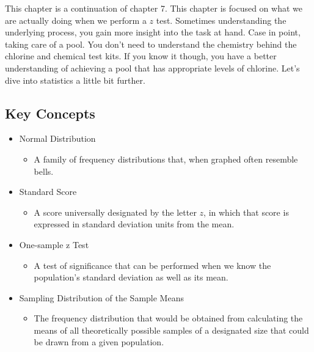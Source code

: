 \documentclass[]{article}
\begin{document}
This chapter is a continuation of chapter 7. This chapter is focused on
what we are actually doing when we perform a $z$ test. Sometimes
understanding the underlying process, you gain more insight into the
task at hand. Case in point, taking care of a pool. You don't need to
understand the chemistry behind the chlorine and chemical test kits. If
you know it though, you have a better understanding of achieving a pool
that has appropriate levels of chlorine. Let's dive into statistics a
little bit further.

\subsection{Key Concepts}\label{key-concepts}

\begin{itemize}
\itemsep1pt\parskip0pt
\item
  Normal Distribution

  \begin{itemize}
  \itemsep1pt\parskip0pt
  \item
    A family of frequency distributions that, when graphed often
    resemble bells.
  \end{itemize}
\item
  Standard Score

  \begin{itemize}
  \itemsep1pt\parskip0pt
  \item
    A score universally designated by the letter $z$, in which that
    score is expressed in standard deviation units from the mean.
  \end{itemize}
\item
  One-sample z Test

  \begin{itemize}
  \itemsep1pt\parskip0pt
  \item
    A test of significance that can be performed when we know the
    population's standard deviation as well as its mean.
  \end{itemize}
\item
  Sampling Distribution of the Sample Means

  \begin{itemize}
  \itemsep1pt\parskip0pt
  \item
    The frequency distribution that would be obtained from calculating
    the means of all theoretically possible samples of a designated size
    that could be drawn from a given population.
  \end{itemize}
\end{itemize}
\end{document}
